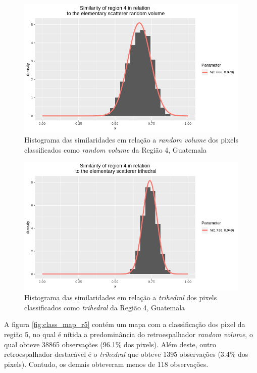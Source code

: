 \documentclass[12pt]{article}
\begin{document}
\begin{figure}[!h]
    \centering   
    \vspace{0.1\linewidth}
    \includegraphics[width = 0.9\linewidth]{../../Images/Report_18_12_20/Classifier_Geo_Dist/Histograms/Guate/region4_rv_sm_filter.png}
    \caption{Histograma das similaridades em relação a \textit{random volume} dos pixels classificados como \textit{random volume} da Região 4, Guatemala}
    \label{fig:class_hist_r4_rv}
\end{figure}

\begin{figure}[!h]
    \centering    
    \includegraphics[width = 0.9\linewidth]{../../Images/Report_18_12_20/Classifier_Geo_Dist/Histograms/Guate/region4_tri_sm_filter.png}
    \caption{Histograma das similaridades em relação a \textit{trihedral} dos pixels classificados como \textit{trihedral} da Região 4, Guatemala}
    \label{fig:class_hist_r4_tri}
\end{figure}

A figura \ref{fig:class_map_r5} contém um mapa com a classificação dos pixel da região 5, no qual é nítida a predominância do retroespalhador \textit{random volume}, o qual obteve 38865 observações (96.1\% dos pixels). Além deste, outro retroespalhador destacável é o \textit{trihedral} que obteve 1395 observações (3.4\% dos pixels). Contudo, os demais obteveram menos de 118 observações. 
\end{document}
